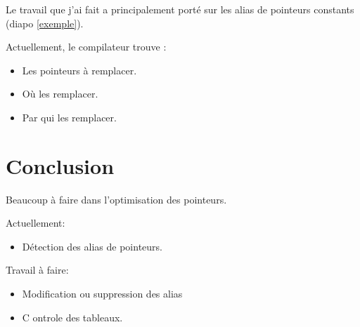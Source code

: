 \begin{frame}
  Le travail que j'ai fait a principalement porté sur les alias de pointeurs constants (diapo \ref{exemple}).
  
  Actuellement, le compilateur trouve : 
  \begin{itemize}
  \item Les pointeurs à remplacer.
  \item Où les remplacer.
  \item Par qui les remplacer.
  \end{itemize}
\end{frame}

\section{Conclusion}
\begin{frame}

  Beaucoup à faire dans l'optimisation des pointeurs.
  
  Actuellement:
  \begin{itemize}
  \item Détection des alias de pointeurs.
  \end{itemize}
\end{frame}

\begin{frame}
  Travail à faire:
  \begin{itemize}
  \item Modification ou suppression des alias
  \item C
ontrole des tableaux.
  \end{itemize}
  
\end{frame}
